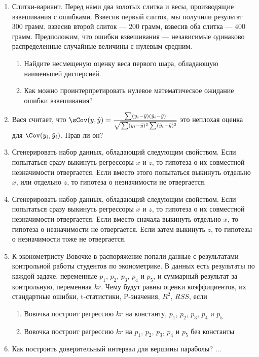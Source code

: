 \documentclass[pdftex,12pt,a4paper]{article}
\def \hy{\hat{y}}
\newcommand{\solution}[1]{}
\newcommand{\problem}[1]{#1}
\begin{document}
\begin{enumerate}
\item \problem{ Слитки-вариант. Перед нами два золотых слитка и весы, производящие взвешивания с ошибками. Взвесив первый слиток, мы получили результат $300$ грамм, взвесив второй слиток --- $200$ грамм, взвесив оба слитка --- $400$ грамм. Предположим, что ошибки взвешивания --- независимые одинаково распределенные случайные величины с нулевым средним. 
\begin{enumerate}
\item Найдите несмещеную оценку веса первого шара, обладающую наименьшей дисперсией.
\item Как можно проинтерпретировать нулевое математическое ожидание ошибки взвешивания? 
\end{enumerate} }
\solution{ Как отсутствие систематической ошибки.} 

\item Вася считает, что $\sCov(y,\hy)=\frac{\sum (y_i-\bar{y})(\hy_i-\bar{y})}{\sqrt{\sum (y_i-\bar{y})^2 \sum (\hy_i-\bar{y})^2}}$ это неплохая оценка для $\Cov(y_i,\hy_i)$. Прав ли он?
\solution{Не прав. Ковариация $\Cov(y_i,\hy_i)$ зависит от $i$, это не одно неизвестное число, для которого можно предложить одну оценку.}


\item Сгенерировать набор данных, обладающий следующим свойством. Если попытаться сразу выкинуть регрессоры $x$ и $z$, то гипотеза о их совместной незначимости отвергается. Если вместо этого попытаться выкинуть отдельно $x$, или отдельно $z$, то гипотеза о незначимости не отвергается.
\solution{Сгенерировать сильно коррелированные $x$ и $z$}


\item Сгенерировать набор данных, обладающий следующим свойством. Если попытаться сразу выкинуть регрессоры $x$ и $z$, то гипотеза о их совместной незначимости отвергается. Если вместо сначала выкинуть отдельно $x$, то гипотеза о незначимости не отвергается. Если затем выкинуть $z$, то гипотезы о незначимости тоже не отвергается.
\solution{??}

\item К эконометристу Вовочке в распоряжение попали данные с результатами контрольной работы студентов по эконометрике. В данных есть результаты по каждой задаче, переменные $p_1$, $p_2$, $p_3$, $p_4$ и $p_5$, и суммарный результат за контрольную, переменная $kr$. Чему будут равны оценки коэффициентов, их стандартные ошибки, t-статистики, P-значения, $R^2$, $RSS$, если
\begin{enumerate}
\item Вовочка построит регрессию $kr$ на константу, $p_1$, $p_2$, $p_3$, $p_4$ и $p_5$
\item Вовочка построит регрессию $kr$ на $p_1$, $p_2$, $p_3$, $p_4$ и $p_5$ без константы
\end{enumerate}
\solution{}


\item Как построить доверительный интервал для вершины параболы? ...
\solution{bootstrap, дельта-метод}

\end{enumerate}
\end{document}

